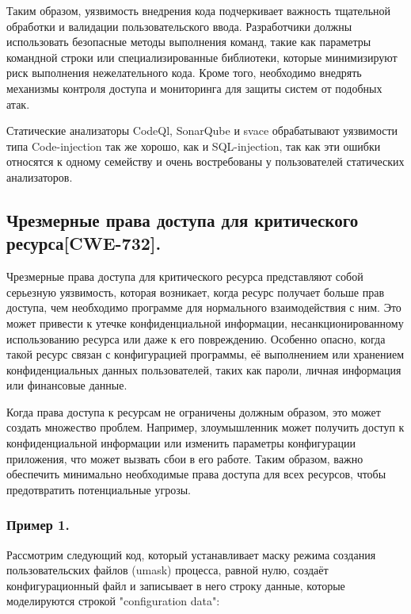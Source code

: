 \documentclass[a4paper,12pt]{article} %
\begin{document}
			\par Таким образом, уязвимость внедрения кода подчеркивает важность тщательной обработки и валидации пользовательского ввода. Разработчики должны использовать безопасные методы выполнения команд, такие как параметры командной строки или специализированные библиотеки, которые минимизируют риск выполнения нежелательного кода. Кроме того, необходимо внедрять механизмы контроля доступа и мониторинга для защиты систем от подобных атак.

			\par Статические анализаторы CodeQl, SonarQube и svace обрабатывают уязвимости типа Code-injection так же хорошо, как и SQL-injection, так как эти ошибки относятся к одному семейству и очень востребованы у пользователей статических анализаторов.

		\subsection{Чрезмерные права доступа для критического ресурса[CWE-732].}
			Чрезмерные права доступа для критического ресурса представляют собой серьезную уязвимость, которая возникает, когда ресурс получает больше прав доступа, чем необходимо программе для нормального взаимодействия с ним. Это может привести к утечке конфиденциальной информации, несанкционированному использованию ресурса или даже к его повреждению. Особенно опасно, когда такой ресурс связан с конфигурацией программы, её выполнением или хранением конфиденциальных данных пользователей, таких как пароли, личная информация или финансовые данные.

			\par Когда права доступа к ресурсам не ограничены должным образом, это может создать множество проблем. Например, злоумышленник может получить доступ к конфиденциальной информации или изменить параметры конфигурации приложения, что может вызвать сбои в его работе. Таким образом, важно обеспечить минимально необходимые права доступа для всех ресурсов, чтобы предотвратить потенциальные угрозы.

			\subsubsection{Пример 1.}\label{example-1}
				Рассмотрим следующий код, который устанавливает маску режима создания пользовательских файлов (umask) процесса, равной нулю, создаёт конфигурационный файл и записывает в него строку данные, которые моделируются строкой "configuration data":
\end{document}
